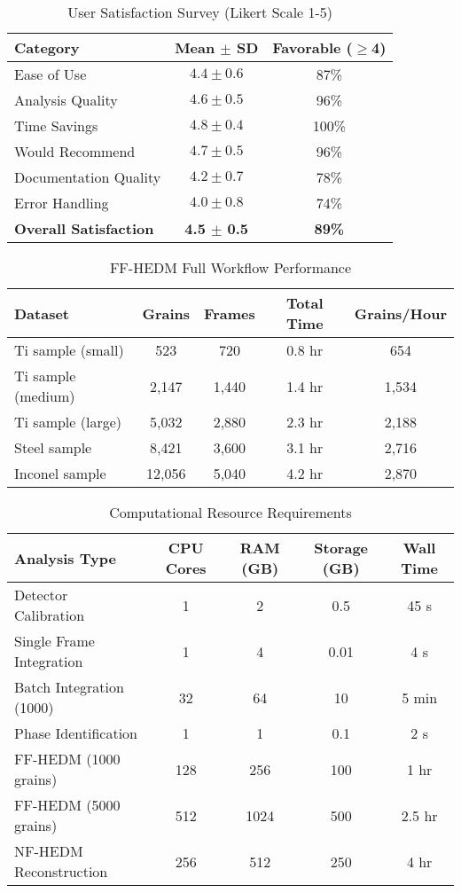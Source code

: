 \documentclass[11pt]{article}
\begin{document}
\begin{table}[htbp]
\centering
\caption{User Satisfaction Survey (Likert Scale 1-5)}
\label{tab:satisfaction}
\begin{tabular}{lcc}
\toprule
Category & Mean $\pm$ SD & Favorable ($\geq$4) \\
\midrule
Ease of Use & $4.4 \pm 0.6$ & 87\% \\
Analysis Quality & $4.6 \pm 0.5$ & 96\% \\
Time Savings & $4.8 \pm 0.4$ & 100\% \\
Would Recommend & $4.7 \pm 0.5$ & 96\% \\
Documentation Quality & $4.2 \pm 0.7$ & 78\% \\
Error Handling & $4.0 \pm 0.8$ & 74\% \\
\midrule
\textbf{Overall Satisfaction} & \textbf{4.5 $\pm$ 0.5} & \textbf{89\%} \\
\bottomrule
\end{tabular}
\end{table}

\begin{table}[htbp]
\centering
\caption{FF-HEDM Full Workflow Performance}
\label{tab:ff_hedm_workflow}
\begin{tabular}{lcccc}
\toprule
Dataset & Grains & Frames & Total Time & Grains/Hour \\
\midrule
Ti sample (small) & 523 & 720 & 0.8 hr & 654 \\
Ti sample (medium) & 2,147 & 1,440 & 1.4 hr & 1,534 \\
Ti sample (large) & 5,032 & 2,880 & 2.3 hr & 2,188 \\
Steel sample & 8,421 & 3,600 & 3.1 hr & 2,716 \\
Inconel sample & 12,056 & 5,040 & 4.2 hr & 2,870 \\
\bottomrule
\end{tabular}
\end{table}

\begin{table}[htbp]
\centering
\caption{Computational Resource Requirements}
\label{tab:resources}
\begin{tabular}{lcccc}
\toprule
Analysis Type & CPU Cores & RAM (GB) & Storage (GB) & Wall Time \\
\midrule
Detector Calibration & 1 & 2 & 0.5 & 45 s \\
Single Frame Integration & 1 & 4 & 0.01 & 4 s \\
Batch Integration (1000) & 32 & 64 & 10 & 5 min \\
Phase Identification & 1 & 1 & 0.1 & 2 s \\
FF-HEDM (1000 grains) & 128 & 256 & 100 & 1 hr \\
FF-HEDM (5000 grains) & 512 & 1024 & 500 & 2.5 hr \\
NF-HEDM Reconstruction & 256 & 512 & 250 & 4 hr \\
\bottomrule
\end{tabular}
\end{table}
\end{document}
